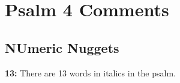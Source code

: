 \section{Psalm 4 Comments}

\subsection{NUmeric Nuggets}
\textbf{13:} There are 13 words in italics in the psalm.
